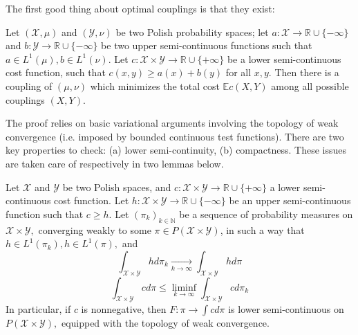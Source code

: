 The first good thing about optimal couplings is that they exist:
\begin{thm}
	Let \( ( \mathcal { X } , \mu ) \) and \( ( \mathcal { Y } , \nu ) \) be two Polish probability spaces; let \( a: \mathcal { X } \rightarrow \mathbb { R } \cup \{ - \infty \} \) and \( b: \mathcal { Y } \rightarrow \mathbb { R } \cup \{ - \infty \} \) be two upper semi-continuous functions such that \( a \in L ^ { 1 } ( \mu ) , b \in L ^ { 1 } ( \nu ) . \) Let \( c: \mathcal { X } \times \mathcal { Y } \rightarrow \mathbb { R } \cup \{ + \infty \} \) be a lower semi-continuous cost function, such that \( c ( x , y ) \geq a ( x ) + b ( y ) \) for all \( x , y . \) Then there is a coupling of \( ( \mu , \nu ) \) which minimizes the total cost \( \mathbb { E } c ( X , Y ) \) among all possible couplings \( ( X , Y ) \).
\end{thm}
The proof relies on basic variational arguments involving the topology of weak convergence (i.e. imposed by bounded continuous test functions). There are two key properties to check: (a) lower semi-continuity, (b) compactness. These issues are taken care of respectively in two lemmas below.

\begin{lem}
	\label{lower_semi-continuity_of_the_cost_functional}
	Let \( \mathcal { X } \) and \( \mathcal { Y } \) be two Polish spaces, and \( c: \mathcal { X } \times \mathcal { Y } \rightarrow \mathbb { R } \cup \{ + \infty \} \) a lower semi-continuous cost function. Let \( h: \mathcal { X } \times \mathcal { Y } \rightarrow \mathbb { R } \cup \{ - \infty \} \) be an upper semi-continuous function such that \( c \geq h . \) Let \( \left( \pi _ { k } \right) _ { k \in \mathbb { N } } \) be a sequence of
	probability measures on \( \mathcal { X } \times \mathcal { Y } , \) converging weakly to some \( \pi \in P ( \mathcal { X } \times \mathcal { Y } ) \), in such a way that \( h \in L ^ { 1 } \left( \pi _ { k } \right) , h \in L ^ { 1 } ( \pi ) , \) and
	\[ \int _ { \mathcal { X } \times \mathcal { Y } } h d \pi _ { k } \underset { k \rightarrow \infty } { \longrightarrow } \int _ { \mathcal { X } \times \mathcal { Y } } h d \pi \]
	\[ \int _ { \mathcal { X } \times \mathcal { Y } } c d \pi \leq \liminf _ { k \rightarrow \infty } \int _ { \mathcal { X } \times \mathcal { Y } } c d \pi _ { k } \]
	In particular, if \( c \) is nonnegative, then \( F: \pi \rightarrow \int c d \pi \) is lower semi-continuous on \( P ( \mathcal { X } \times \mathcal { Y } ) , \) equipped with the topology of weak convergence.
\end{lem}

